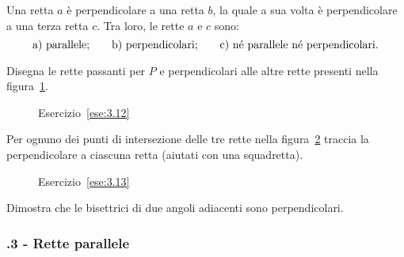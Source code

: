 \begin{esercizio}
\label{ese:3.11}
Una retta $a$ è perpendicolare a una retta $b$, la quale a sua volta è perpendicolare a una terza retta $c$. Tra loro, le rette $a$ e $c$ sono:
\[\text{a) parallele;\qquad b) perpendicolari;\qquad c) né parallele né perpendicolari.}\]
\end{esercizio}

\begin{esercizio}
\label{ese:3.12}
Disegna le rette passanti per $P$ e perpendicolari alle altre rette presenti nella figura~\ref{fig:ese3.12}.
\end{esercizio}

\begin{figure}[htb]
\centering
\caption{Esercizio~\ref{ese:3.12}}\label{fig:ese3.12}
\end{figure}

\begin{esercizio}
\label{ese:3.13}
Per ognuno dei punti di intersezione delle tre rette nella figura~\ref{fig:ese3.13} traccia la perpendicolare a ciascuna retta (aiutati con una squadretta).
\end{esercizio}

\begin{figure}[htb]
\centering
\caption{Esercizio~\ref{ese:3.13}}\label{fig:ese3.13}
\end{figure}

\begin{esercizio}
\label{ese:3.14}
Dimostra che le bisettrici di due angoli adiacenti sono perpendicolari.
\end{esercizio}

\subsubsection*{\thechapter.3 - Rette parallele}

